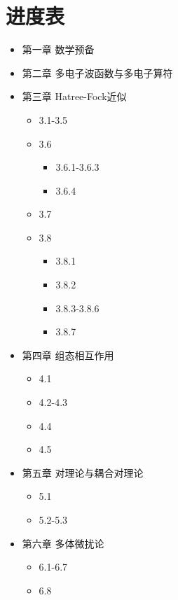 \chapter*{进度表}
\begin{itemize}
    \item[\Square] 第一章 数学预备
    \item[\CheckedBox] 第二章 多电子波函数与多电子算符
    \item[\DSquare] 第三章 Hatree-Fock近似 \begin{itemize}
        \item[\CheckedBox] 3.1-3.5
        \item[\DSquare] 3.6 \begin{itemize}
            \item[\CheckedBox] 3.6.1-3.6.3
            \item[\Square] 3.6.4
        \end{itemize}
        \item[\Square] 3.7
        \item[\DSquare] 3.8 \begin{itemize}
            \item[\CheckedBox] 3.8.1
            \item[\DSquare] 3.8.2
            \item[\Square] 3.8.3-3.8.6
            \item[\DSquare] 3.8.7
        \end{itemize}
    \end{itemize}
    \item[\DSquare] 第四章 组态相互作用 \begin{itemize}
        \item[\DSquare] 4.1
        \item[\Square] 4.2-4.3
        \item[\CheckedBox] 4.4
        \item[\DSquare] 4.5
    \end{itemize}
    \item[\DSquare] 第五章 对理论与耦合对理论 \begin{itemize}
        \item[\DSquare] 5.1
        \item[\Square] 5.2-5.3
    \end{itemize}
    \item[\DSquare] 第六章 多体微扰论 \begin{itemize}
        \item[\CheckedBox] 6.1-6.7
        \item[\Square] 6.8 

\end{itemize}
\end{itemize}
